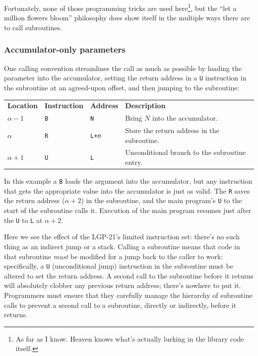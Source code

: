 Fortunately, none of those programming tricks are used here\footnote{As far as I know. Heaven knows what's actually lurking in the library code itself.}, but the ``let a million flowers bloom'' philosophy does show itself in the multiple ways there are to call subroutines.

\label{subsec:standard-call1}
\subsubsection*{Accumulator-only parameters}
One calling convention streamlines the call as much as possible by loading the parameter into the accumulator, setting the return address in a \texttt{U} instruction in the subroutine at an agreed-upon offset, and then jumping to the subroutine:
\begin{center}
\begin{tabularx}{\textwidth}{lllX}
\textbf{Location} & \textbf{Instruction} & \textbf{Address} & \textbf{Description} \\
$\alpha-1$      & \texttt{B}            & \texttt{N}       & Bring $N$ into the accumulator. \\
$\alpha$      & \texttt{R}            & \texttt{L+\textit{n}}    & Store the return address in the subroutine. \\
$\alpha+1$      & \texttt{U}            & \texttt{L}       & Unconditional branch to the subroutine entry. \\
\end{tabularx}
\end{center}

In this example a \texttt{B} loads the argument into the accumulator, but any instruction that gets the appropriate value into the accumulator is just as valid. The \texttt{R} saves the return address ($\alpha+2$) in the subroutine, and the main program's \texttt{U} to the start of the subroutine calls it. Execution of the main program resumes just after the \texttt{U} to \texttt{L} at $\alpha+2$.

Here we see the effect of the LGP-21's limited instruction set: there's no such thing as an indirect jump or a stack. Calling a subroutine means that code in that subroutine \emph{must} be modified for a jump back to the caller to work: specifically, a \texttt{U} (unconditional jump) instruction in the subroutine must be altered to set the return address. A second call to the subroutine before it returns will absolutely clobber any previous return address; there's nowhere to put it. Programmers must ensure that they carefully manage the hierarchy of subroutine calls to prevent a second call to a subroutine, directly or indirectly, before it returns.


